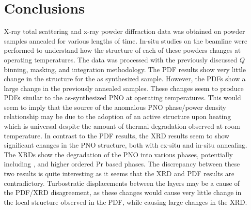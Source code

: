 \section{Conclusions}
X-ray total scattering and x-ray powder diffraction data was obtained on  powder samples annealed for various lengths of time.
In-situ studies on the beamline were performed to understand how the structure of each of these powders changes at operating temperatures.
The data was processed with the previously discussed $Q$ binning, masking, and integration methodology.
The PDF results show very little change in the structure for the as synthesized sample.
However, the PDFs show a large change in the previously annealed samples.
These changes seem to produce PDFs similar to the as-synthesized PNO at operating temperatures.
This would seem to imply that the source of the anomalous PNO phase/power density relationship may be due to the adoption of an active structure upon heating which is universal despite the amount of thermal degradation observed at room temperature.
In contrast to the PDF results, the XRD results seem to show significant changes in the PNO structure, both with ex-situ and in-situ annealing.
The XRDs show the degradation of the PNO into various phases, potentially including , and higher ordered Pr based phases.
The discrepancy between these two results is quite interesting as it seems that the XRD and PDF results are contradictory.
Turbostratic displacements between the layers may be a cause of the PDF/XRD disagreement, as these changes would cause very little change in the local structure observed in the PDF, while causing large changes in the XRD.
